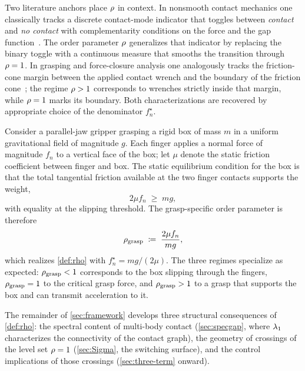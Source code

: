 Two literature anchors place $\rho$ in context. In nonsmooth
contact mechanics one classically tracks a discrete contact-mode
indicator that toggles between \emph{contact} and \emph{no
contact} with complementarity conditions on the force and the gap
function~\citep{Brogliato2016}. The order parameter $\rho$
generalizes that indicator by replacing the binary toggle with a
continuous measure that smooths the transition through
$\rho = 1$. In grasping and force-closure analysis one
analogously tracks the friction-cone margin between the applied
contact wrench and the boundary of the friction
cone~\citep{MurrayLiSastry1994}; the regime $\rho > 1$
corresponds to wrenches strictly inside that
margin, while $\rho = 1$ marks its boundary. Both
characterizations are recovered by appropriate choice of the
denominator $f_{n}^{\star}$.

\begin{example}
\label{ex:parallel-jaw}
Consider a parallel-jaw gripper grasping a rigid box of mass $m$
in a uniform gravitational field of magnitude $g$. Each finger
applies a normal force of magnitude $f_{n}$ to a vertical face of
the box; let $\mu$ denote the static friction coefficient between
finger and box. The static equilibrium condition for the box is
that the total tangential friction available at the two finger
contacts supports the weight,
\[
2 \mu f_{n} \;\ge\; m g,
\]
with equality at the slipping threshold. The grasp-specific
order parameter is therefore
\begin{equation}
\label{eq:rho-grasp}
\rho_{\mathrm{grasp}} \;\coloneqq\; \frac{2 \mu f_{n}}{m g},
\end{equation}
which realizes \cref{def:rho} with $f_{n}^{\star} = m g / (2 \mu)$.
The three regimes specialize as expected:
$\rho_{\mathrm{grasp}} < 1$ corresponds to the box slipping
through the fingers, $\rho_{\mathrm{grasp}} = 1$ to the
critical grasp force, and $\rho_{\mathrm{grasp}} > 1$ to a
grasp that supports the box and can transmit acceleration to it.
\end{example}

The remainder of \cref{sec:framework} develops three structural
consequences of \cref{def:rho}: the spectral content of multi-body
contact (\cref{sec:specgap}, where $\lambda_{1}$ characterizes the
connectivity of the contact graph), the geometry of crossings of
the level set $\rho = 1$ (\cref{sec:Sigma}, the switching
surface), and the control implications of those crossings
(\cref{sec:three-term} onward).

